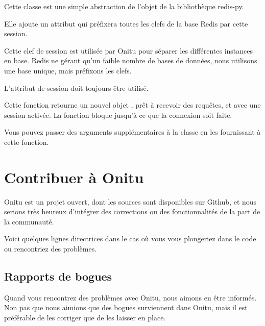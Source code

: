 \documentclass[letterpaper,10pt,english]{sphinxmanual}
\begin{document}
\begin{fulllineitems}
\label{components:onitu.utils.Redis}
Cette classe est une simple abstraction de l'objet  de la bibliothèque redis-py.

Elle ajoute un attribut  qui préfixera toutes les clefs de la base Redis par cette session.

Cette clef de session est utilisée par Onitu pour séparer les différentes instances en base. Redis ne gérant qu'un faible nombre de bases de données, nous utilisons une base unique, mais préfixons les clefs.

L'attribut de session doit toujours être utilisé.

\end{fulllineitems}


\begin{fulllineitems}
\label{components:onitu.utils.connect_to_redis}
Cette fonction retourne un nouvel objet {\hyperref[components:onitu.utils.Redis]{}}, prêt à recevoir des requêtes, et avec une session activée. La fonction bloque jusqu'à ce que la connexion soit faite.

Vous pouvez passer des arguments supplémentaires à la classe {\hyperref[components:onitu.utils.Redis]{}} en les fournissant à cette fonction.

\end{fulllineitems}



\section{Contribuer à Onitu}
\label{contribute:contributing-to-onitu}\label{contribute::doc}
Onitu est un projet ouvert, dont les sources sont disponibles sur Github, et nous serions très heureux d'intégrer des corrections ou des fonctionnalités de la part de la communauté.

Voici quelques lignes directrices dans le cas où vous vous plongeriez dans le code ou rencontriez des problèmes.


\subsection{Rapports de bogues}
\label{contribute:reporting-issues}
Quand vous rencontrez des problèmes avec Onitu, nous aimons en être informés. Non pas que nous aimions que des bogues surviennent dans Onitu, mais il est préférable de les corriger que de les laisser en place.
\end{document}
